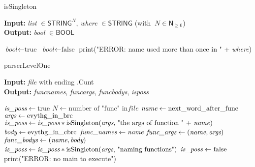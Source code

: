 \documentclass{article}
\begin{document}
\begin{algorithm}
    \caption{isSingleton}\label{alg:isSingleton}
    \textbf{Input:} \textit{list} $\in\mathsf{STRING}^N$, \textit{where} $\in\mathsf{STRING}$ (with $\ N\in\mathsf{N}_{\geq 0}$)\\
    \textbf{Output:} \textit{bool} $\in\mathsf{BOOL}$
    \begin{algorithmic}
            \State $\textit{bool} \gets \text{true}$
        \Else
            \State $\textit{bool} \gets \text{false}$
            \State print("ERROR: name used more than once in " + \textit{where})
        \EndIf
    \end{algorithmic}
\end{algorithm}

\begin{algorithm}
    \caption{parserLevelOne}\label{alg:parserLevelOne}
    \textbf{Input:} \textit{file} with ending .Cunt\\
    \textbf{Output:} \textit{func\textunderscore names}, \textit{func\textunderscore args}, \textit{func\textunderscore bodys}, \textit{is\textunderscore poss}
    \begin{algorithmic}
        \State $\textit{is\textunderscore poss} \gets \text{true}$
        \State $N \gets \text{number of "func" in} \textit{file}$
            \State $\textit{name} \gets \text{next\textunderscore word\textunderscore after\textunderscore func}$
            \State $\textit{args} \gets \text{evythg\textunderscore in\textunderscore brc}$
            \State $\textit{is\textunderscore poss} \gets \textit{is\textunderscore poss} * \text{isSingleton(\textit{args}, "the args of function " + \textit{name})}$
            \State $\textit{body} \gets \text{evythg\textunderscore in\textunderscore cbrc}$
            \State $\textit{func\textunderscore names} \gets \textit{name}$
            \State $\textit{func\textunderscore args} \gets (\textit{name},\textit{args})$
            \State $\textit{func\textunderscore bodys} \gets (\textit{name},\textit{body})$
        \EndFor
        \State $\textit{is\textunderscore poss} \gets \textit{is\textunderscore poss}*\text{isSingleton(\textit{args}, "naming functions")}$
            \State $\textit{is\textunderscore poss} \gets \text{false}$
            \State print("ERROR: no main to execute")
        \EndIf
    \end{algorithmic}
\end{algorithm}
\end{document}
